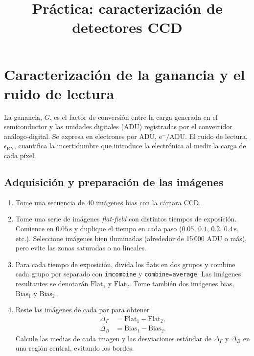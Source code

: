 \documentclass[12pt,a4paper]{article}
\title{Práctica: caracterización de detectores CCD}
\author{\mbox{}}
\date{}
\begin{document}
\maketitle

\section{Caracterización de la ganancia y el ruido de lectura}

La ganancia, $G$, es el factor de conversión entre la carga generada en el
semiconductor y las unidades digitales (ADU) registradas por el convertidor
análogo-digital. Se expresa en electrones por ADU, $\mathrm{e^-}/\mathrm{ADU}$.
El ruido de lectura, $\epsilon_{\text{RN}}$, cuantifica la incertidumbre que
introduce la electrónica al medir la carga de cada píxel.




\subsection{Adquisición y preparación de las imágenes}

\begin{enumerate}
    \item Tome una secuencia de 40 imágenes bias con la cámara CCD.
    \item Tome una serie de imágenes \emph{flat-field} con distintos tiempos
    de exposición. Comience en $0.05\,\mathrm{s}$ y duplique el tiempo en cada
    paso ($0.05$, $0.1$, $0.2$, $0.4\,\mathrm{s}$, etc.). Seleccione imágenes
    bien iluminadas (alrededor de 15\,000 ADU o más), pero evite las zonas
    saturadas o no lineales.
    \item Para cada tiempo de exposición, divida los flats en dos grupos y
    combine cada grupo por separado con \texttt{imcombine} y
    \texttt{combine=average}. Las imágenes resultantes se denotarán
    $\text{Flat}_1$ y $\text{Flat}_2$. Tome también dos imágenes bias,
    $\text{Bias}_1$ y $\text{Bias}_2$.
    \item Reste las imágenes de cada par para obtener
    \begin{align*}
        \Delta_F &= \text{Flat}_1 - \text{Flat}_2,\\
        \Delta_B &= \text{Bias}_1 - \text{Bias}_2.
    \end{align*}
    Calcule las medias de cada imagen y las desviaciones estándar de
    $\Delta_F$ y $\Delta_B$ en una región central, evitando los bordes.
\end{enumerate}
\end{document}
